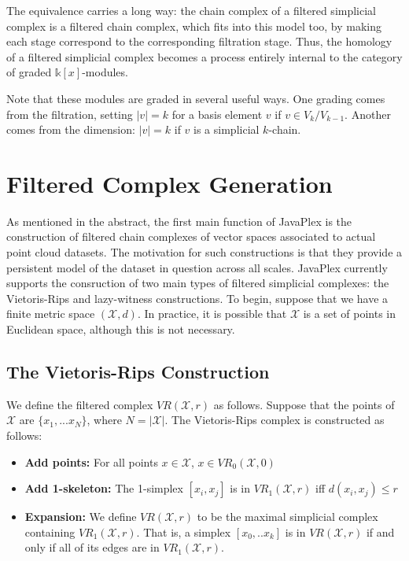 \documentclass[10pt]{article}
\begin{document}
The equivalence carries a long way: the chain complex of a filtered
simplicial complex is a filtered chain complex, which fits into this
model too, by making each stage correspond to the corresponding
filtration stage. Thus, the homology of a filtered simplicial complex
becomes a process entirely internal to the category of graded $\mathbb
k[x]$-modules.

Note that these modules are graded in several useful ways. One grading
comes from the filtration, setting $|v|=k$ for a basis element $v$ if
$v\in V_k/V_{k-1}$. Another comes from the dimension: $|v|=k$ if $v$
is a simplicial $k$-chain.



\section{Filtered Complex Generation}

As mentioned in the abstract, the first main function of JavaPlex is the construction of filtered chain complexes of vector spaces associated to actual point cloud datasets. The motivation for such constructions is that they provide a persistent model of the dataset in question across all scales. JavaPlex currently supports the consruction of two main types of filtered simplicial complexes: the Vietoris-Rips and lazy-witness constructions. To begin, suppose that we have a finite metric space $(\mathcal{X}, d)$. In practice, it is possible that $\mathcal{X}$ is a set of points in Euclidean space, although this is not necessary.

\subsection{The Vietoris-Rips Construction}
We define the filtered complex $VR(\mathcal{X}, r)$ as follows. Suppose that the points of $\mathcal{X}$ are $\{x_1, ... x_N\}$, where $N = |\mathcal{X}|$. The Vietoris-Rips complex is constructed as follows:

\begin{itemize}
\item {\bf Add points:} For all points $x \in \mathcal{X}$, $x \in VR_0(\mathcal{X}, 0)$
\item {\bf Add 1-skeleton:} The 1-simplex $[x_i, x_j]$ is in $VR_1(\mathcal{X}, r)$ iff $d(x_i, x_j) \leq r$
\item {\bf Expansion:} We define $VR(\mathcal{X}, r)$ to be the maximal simplicial complex containing $VR_1(\mathcal{X}, r)$. That is, a simplex $[x_0, .. x_k]$ is in $VR(\mathcal{X}, r)$ if and only if all of its edges are in $VR_1(\mathcal{X}, r)$.
\end{itemize}
\end{document}
